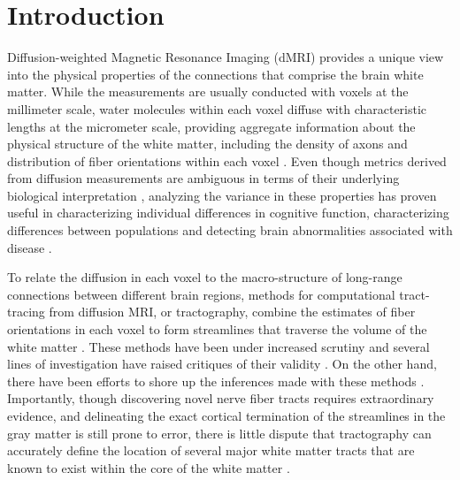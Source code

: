 \section*{Introduction}

Diffusion-weighted Magnetic Resonance Imaging (dMRI) provides a unique
view into the physical properties of the connections that comprise
the brain white matter. While the measurements are usually conducted
with voxels at the millimeter scale, water molecules within each voxel
diffuse with characteristic lengths at the micrometer scale, providing
aggregate information about the physical structure of the white matter,
including the density of axons and distribution of fiber
orientations within each voxel \cite{wandell2016clarifying}. Even though
metrics derived from diffusion measurements are ambiguous in terms
of their underlying biological interpretation \cite{Jones2013-xv},
analyzing the variance in these properties has proven useful in
characterizing individual differences in cognitive function,
characterizing differences between populations and detecting brain
abnormalities associated with disease \cite{Thomason2011-qn}.

To relate the diffusion in each voxel to the macro-structure of
long-range connections between different brain regions, methods for
computational tract-tracing from diffusion MRI, or tractography, combine
the estimates of fiber orientations in each voxel to form streamlines
that traverse the volume of the white matter \cite{Conturo1999-je,
Mori2002-qi}. These methods have been under increased scrutiny and
several lines of investigation have raised critiques of their validity
\cite{Maier-Hein2017-vb, Thomas2014-ki}. On the other hand, there
have been efforts to shore up the inferences made with these methods
\cite{Pestilli2014NatMeth, Takemura2016-sh, Smith2013-nc, Smith2015-cx,
Smith2015-zt, Rheault2018-wk}. Importantly, though discovering novel
nerve fiber tracts requires extraordinary evidence, and delineating
the exact cortical termination of the streamlines in the gray matter
is still prone to error, there is little dispute that tractography
can accurately define the location of several major white matter
tracts that are known to exist within the core of the white matter
\cite{Maier-Hein2017-vb}.

